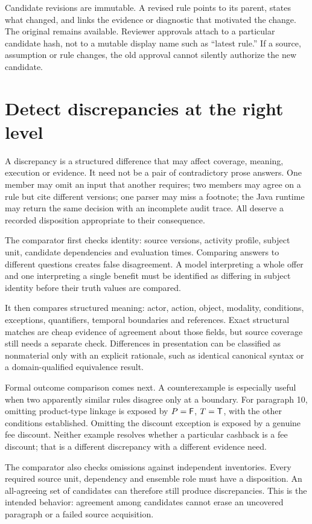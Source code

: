 Candidate revisions are immutable. A revised rule points to its parent, states
what changed, and links the evidence or diagnostic that motivated the change.
The original remains available. Reviewer approvals attach to a particular
candidate hash, not to a mutable display name such as ``latest rule.'' If a
source, assumption or rule changes, the old approval cannot silently authorize
the new candidate.

\section{Detect discrepancies at the right level}

A discrepancy is a structured difference that may affect coverage, meaning,
execution or evidence. It need not be a pair of contradictory prose answers.
One member may omit an input that another requires; two members may agree on a
rule but cite different versions; one parser may miss a footnote; the Java
runtime may return the same decision with an incomplete audit trace. All deserve
a recorded disposition appropriate to their consequence.

The comparator first checks identity: source versions, activity profile, subject
unit, candidate dependencies and evaluation times. Comparing answers to different
questions creates false disagreement. A model interpreting a whole offer and one
interpreting a single benefit must be identified as differing in subject identity
before their truth values are compared.

It then compares structured meaning: actor, action, object, modality, conditions,
exceptions, quantifiers, temporal boundaries and references. Exact structural
matches are cheap evidence of agreement about those fields, but source coverage
still needs a separate check. Differences in presentation can be classified as
nonmaterial only with an explicit rationale, such as identical canonical syntax
or a domain-qualified equivalence result.

Formal outcome comparison comes next. A counterexample is especially useful when
two apparently similar rules disagree only at a boundary. For paragraph 10,
omitting product-type linkage is exposed by $P=\mathsf{F}$, $T=\mathsf{T}$, with the other
conditions established. Omitting the discount exception is exposed by a genuine
fee discount. Neither example resolves whether a particular cashback is a fee
discount; that is a different discrepancy with a different evidence need.

The comparator also checks omissions against independent inventories. Every
required source unit, dependency and ensemble role must have a disposition. An
all-agreeing set of candidates can therefore still produce discrepancies. This
is the intended behavior: agreement among candidates cannot erase an uncovered
paragraph or a failed source acquisition.

